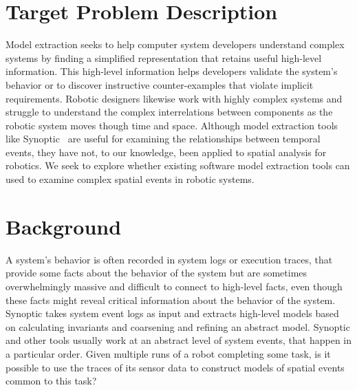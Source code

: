 \section{Target Problem Description}



Model extraction seeks to help computer system developers understand complex systems by finding a simplified representation that retains useful high-level information.
This high-level information helps developers validate the system's behavior or to discover instructive counter-examples that violate implicit requirements. 
Robotic designers likewise work with highly complex systems and struggle to understand the complex interrelations between components as the robotic system moves though time and space.
Although model extraction tools like Synoptic~\cite{schneider2010synoptic} are useful for examining the relationships between temporal events, they have not, to our knowledge, been applied to spatial analysis for robotics. 
We seek to explore whether existing software model extraction tools can used to examine complex spatial events in robotic systems.

\section{Background}
A system's behavior is often recorded in system logs or execution traces, that provide some facts about the behavior of the system but are sometimes overwhelmingly massive and difficult to connect to high-level facts, even though these facts might reveal critical information about the behavior of the system.
Synoptic takes system event logs as input and extracts high-level models based on calculating invariants and coarsening and refining an abstract model.
Synoptic and other tools usually work at an abstract level of system events, that happen in a particular order.
Given multiple runs of a robot completing some task, is it possible to use the traces of its sensor data to construct models of spatial events common to this task?

